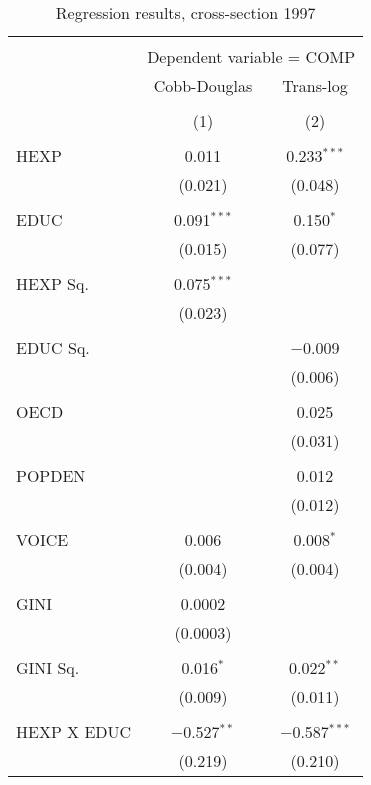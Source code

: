 \documentclass[12pt,a4paper]{article}\usepackage[]{graphicx}\usepackage[]{color}
\begin{document}
\begin{table}[!htbp] \centering 
  \caption{Regression results, cross-section 1997} 
  \label{tab:cs} 
\begin{tabular}{@{\extracolsep{5pt}}lcc} 
\\[-1.8ex]\hline 
\hline \\[-1.8ex] 
 & \multicolumn{2}{c}{Dependent variable = COMP} \\ 
\cline{2-3} 
 & Cobb-Douglas & Trans-log \\ 
\\[-1.8ex] & (1) & (2)\\ 
\hline \\[-1.8ex] 
 HEXP & 0.011 & 0.233$^{***}$ \\ 
  & (0.021) & (0.048) \\ 
  & & \\ 
 EDUC & 0.091$^{***}$ & 0.150$^{*}$ \\ 
  & (0.015) & (0.077) \\ 
  & & \\ 
 HEXP Sq. & 0.075$^{***}$ &  \\ 
  & (0.023) &  \\ 
  & & \\ 
 EDUC Sq. &  & $-$0.009 \\ 
  &  & (0.006) \\ 
  & & \\ 
 OECD &  & 0.025 \\ 
  &  & (0.031) \\ 
  & & \\ 
 POPDEN &  & 0.012 \\ 
  &  & (0.012) \\ 
  & & \\ 
 VOICE & 0.006 & 0.008$^{*}$ \\ 
  & (0.004) & (0.004) \\ 
  & & \\ 
 GINI & 0.0002 &  \\ 
  & (0.0003) &  \\ 
  & & \\ 
 GINI Sq. & 0.016$^{*}$ & 0.022$^{**}$ \\ 
  & (0.009) & (0.011) \\ 
  & & \\ 
 HEXP X EDUC & $-$0.527$^{**}$ & $-$0.587$^{***}$ \\ 
  & (0.219) & (0.210) \\ 

\end{tabular}
\end{table}
\end{document}

